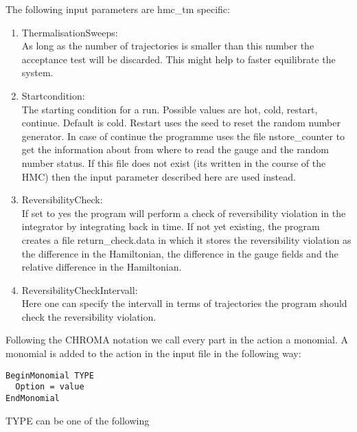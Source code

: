The following input parameters are {\ttfamily hmc\_tm} specific:
\begin{enumerate}
\item {\ttfamily ThermalisationSweeps}:\\
  As long as the number of trajectories is smaller than this number
  the acceptance test will be discarded. This might help to faster
  equilibrate the system.

\item {\ttfamily Startcondition}:\\
  The starting condition for a run. Possible values are {\ttfamily
    hot, cold, restart, continue}. Default is {\ttfamily
    cold}. Restart uses the seed to reset the random number
  generator. In case of {\ttfamily continue} the programme uses the
  file {\ttfamily nstore\_counter} to get the information about from
  where to read the gauge and the random number status. If this file
  does not exist (its written in the course of the HMC) then the input
  parameter described here are used instead.

\item {\ttfamily ReversibilityCheck}:\\
  If set to {\ttfamily yes} the program will perform a check of
  reversibility violation in the integrator by integrating back in
  time. If not yet existing, the program creates a file {\ttfamily
    return\_check.data} in which it stores the reversibility violation
  as the difference in the Hamiltonian, the difference in the gauge
  fields and the relative difference in the Hamiltonian.

\item {\ttfamily ReversibilityCheckIntervall}:\\
  Here one can specify the intervall in terms of trajectories the
  program should check the reversibility violation.

\end{enumerate}
Following the CHROMA notation we call every part in the action a
monomial. A monomial is added to the action in the input file in the
following way:
\begin{verbatim}
BeginMonomial TYPE
  Option = value
EndMonomial
\end{verbatim}
{\ttfamily TYPE} can be one of the following
